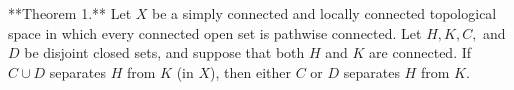 **Theorem 1.** Let $X$ be a simply connected and locally connected topological space in which every connected open set is pathwise connected. Let $H, K, C,$ and $D$ be disjoint closed sets, and suppose that both $H$ and $K$ are connected. If $C \cup D$ separates $H$ from $K$ (in $X$), then either $C$ or $D$ separates $H$ from $K$.
